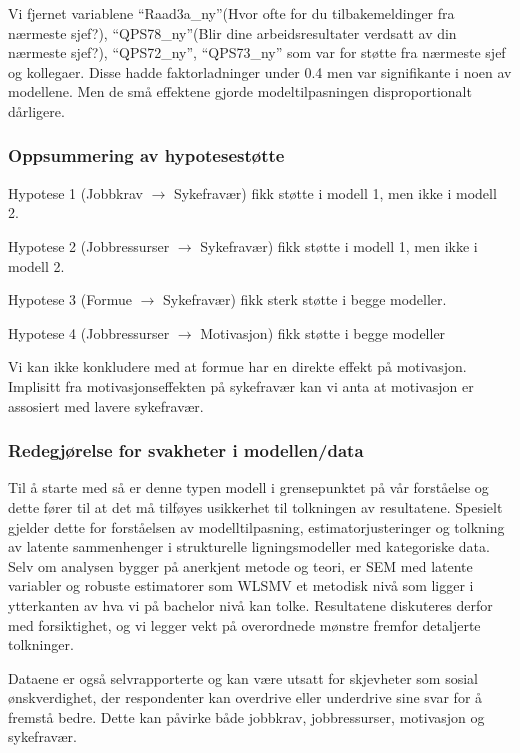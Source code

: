 \documentclass[
  12pt,
  a4paper,
  DIV=11,
  numbers=noendperiod]{scrartcl}
\begin{document}
Vi fjernet variablene ``Raad3a\_ny''(Hvor ofte for du tilbakemeldinger
fra nærmeste sjef?), ``QPS78\_ny''(Blir dine arbeidsresultater verdsatt
av din nærmeste sjef?), ``QPS72\_ny'', ``QPS73\_ny'' som var for støtte
fra nærmeste sjef og kollegaer. Disse hadde faktorladninger under 0.4
men var signifikante i noen av modellene. Men de små effektene gjorde
modeltilpasningen disproportionalt dårligere.

\subsubsection{Oppsummering av
hypotesestøtte}\label{oppsummering-av-hypotesestuxf8tte}

Hypotese 1 (Jobbkrav \(\rightarrow\) Sykefravær) fikk støtte i modell 1,
men ikke i modell 2.

Hypotese 2 (Jobbressurser \(\rightarrow\) Sykefravær) fikk støtte i
modell 1, men ikke i modell 2.

Hypotese 3 (Formue \(\rightarrow\) Sykefravær) fikk sterk støtte i begge
modeller.

Hypotese 4 (Jobbressurser \(\rightarrow\) Motivasjon) fikk støtte i
begge modeller

Vi kan ikke konkludere med at formue har en direkte effekt på
motivasjon. Implisitt fra motivasjonseffekten på sykefravær kan vi anta
at motivasjon er assosiert med lavere sykefravær.

\subsubsection{Redegjørelse for svakheter i
modellen/data}\label{redegjuxf8relse-for-svakheter-i-modellendata}

Til å starte med så er denne typen modell i grensepunktet på vår
forståelse og dette fører til at det må tilføyes usikkerhet til
tolkningen av resultatene. Spesielt gjelder dette for forståelsen av
modelltilpasning, estimatorjusteringer og tolkning av latente
sammenhenger i strukturelle ligningsmodeller med kategoriske data. Selv
om analysen bygger på anerkjent metode og teori, er SEM med latente
variabler og robuste estimatorer som WLSMV et metodisk nivå som ligger i
ytterkanten av hva vi på bachelor nivå kan tolke. Resultatene diskuteres
derfor med forsiktighet, og vi legger vekt på overordnede mønstre
fremfor detaljerte tolkninger.

Dataene er også selvrapporterte og kan være utsatt for skjevheter som
sosial ønskverdighet, der respondenter kan overdrive eller underdrive
sine svar for å fremstå bedre. Dette kan påvirke både jobbkrav,
jobbressurser, motivasjon og sykefravær.
\end{document}
